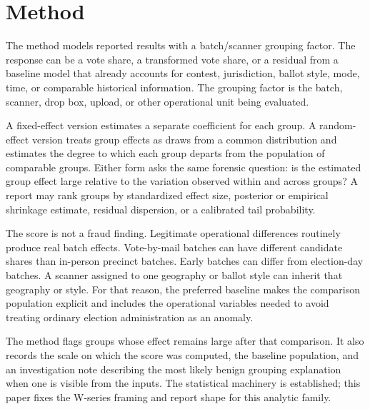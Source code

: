 \section{Method}

The method models reported results with a batch/scanner grouping factor. The
response can be a vote share, a transformed vote share, or a residual from a
baseline model that already accounts for contest, jurisdiction, ballot style,
mode, time, or comparable historical information. The grouping factor is the
batch, scanner, drop box, upload, or other operational unit being evaluated.

A fixed-effect version estimates a separate coefficient for each group. A
random-effect version treats group effects as draws from a common distribution
and estimates the degree to which each group departs from the population of
comparable groups. Either form asks the same forensic question: is the estimated
group effect large relative to the variation observed within and across groups?
A report may rank groups by standardized effect size, posterior or empirical
shrinkage estimate, residual dispersion, or a calibrated tail probability.

The score is not a fraud finding. Legitimate operational differences routinely
produce real batch effects. Vote-by-mail batches can have different candidate
shares than in-person precinct batches. Early batches can differ from
election-day batches. A scanner assigned to one geography or ballot style can
inherit that geography or style. For that reason, the preferred baseline makes
the comparison population explicit and includes the operational variables needed
to avoid treating ordinary election administration as an anomaly.

The method flags groups whose effect remains large after that comparison. It
also records the scale on which the score was computed, the baseline population,
and an investigation note describing the most likely benign grouping explanation
when one is visible from the inputs. The statistical machinery is established;
this paper fixes the W-series framing and report shape for this analytic family.
